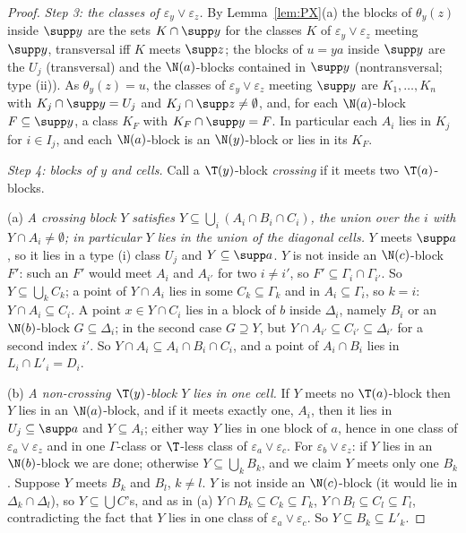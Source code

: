 \begin{proof}
\smallskip\emph{Step 3: the classes of $\varepsilon_y\vee\varepsilon_z$.} By Lemma~\ref{lem:PX}(a) the blocks of $\theta_y(z)$ inside $\supp y$ are the sets $K\cap\supp y$ for the classes $K$ of $\varepsilon_y\vee\varepsilon_z$ meeting $\supp y$, transversal iff $K$ meets $\supp z$; the blocks of $u=ya$ inside $\supp y$ are the $U_j$ (transversal) and the $\N(a)$-blocks contained in $\supp y$ (nontransversal; type (ii)). As $\theta_y(z)=u$, the classes of $\varepsilon_y\vee\varepsilon_z$ meeting $\supp y$ are $K_1,\dots,K_n$ with $K_j\cap\supp y=U_j$ and $K_j\cap\supp z\ne\emptyset$, and, for each $\N(a)$-block $F\subseteq\supp y$, a class $K_F$ with $K_F\cap\supp y=F$. In particular each $A_i$ lies in $K_j$ for $i\in I_j$, and each $\N(a)$-block is an $\N(y)$-block or lies in its $K_F$.

\smallskip\emph{Step 4: blocks of $y$ and cells.} Call a $\T(y)$-block \emph{crossing} if it meets two $\T(a)$-blocks.

(a) \emph{A crossing block $Y$ satisfies $Y\subseteq\bigcup_i(A_i\cap B_i\cap C_i)$, the union over the $i$ with $Y\cap A_i\ne\emptyset$; in particular $Y$ lies in the union of the diagonal cells.} $Y$ meets $\supp a$, so it lies in a type (i) class $U_j$ and $Y\subseteq\supp a$. $Y$ is not inside an $\N(c)$-block $F'$: such an $F'$ would meet $A_i$ and $A_{i'}$ for two $i\ne i'$, so $F'\subseteq\Gamma_i\cap\Gamma_{i'}$. So $Y\subseteq\bigcup_kC_k$; a point of $Y\cap A_i$ lies in some $C_k\subseteq\Gamma_k$ and in $A_i\subseteq\Gamma_i$, so $k=i$: $Y\cap A_i\subseteq C_i$. A point $x\in Y\cap C_i$ lies in a block of $b$ inside $\Delta_i$, namely $B_i$ or an $\N(b)$-block $G\subseteq\Delta_i$; in the second case $G\supseteq Y$, but $Y\cap A_{i'}\subseteq C_{i'}\subseteq\Delta_{i'}$ for a second index $i'$. So $Y\cap A_i\subseteq A_i\cap B_i\cap C_i$, and a point of $A_i\cap B_i$ lies in $L_i\cap L'_i=D_i$.

(b) \emph{A non-crossing $\T(y)$-block $Y$ lies in one cell.} If $Y$ meets no $\T(a)$-block then $Y$ lies in an $\N(a)$-block, and if it meets exactly one, $A_i$, then it lies in $U_j\subseteq\supp a$ and $Y\subseteq A_i$; either way $Y$ lies in one block of $a$, hence in one class of $\varepsilon_a\vee\varepsilon_z$ and in one $\Gamma$-class or $\T$-less class of $\varepsilon_a\vee\varepsilon_c$. For $\varepsilon_b\vee\varepsilon_z$: if $Y$ lies in an $\N(b)$-block we are done; otherwise $Y\subseteq\bigcup_kB_k$, and we claim $Y$ meets only one $B_k$. Suppose $Y$ meets $B_k$ and $B_l$, $k\ne l$. $Y$ is not inside an $\N(c)$-block (it would lie in $\Delta_k\cap\Delta_l$), so $Y\subseteq\bigcup C$'s, and as in (a) $Y\cap B_k\subseteq C_k\subseteq\Gamma_k$, $Y\cap B_l\subseteq C_l\subseteq\Gamma_l$, contradicting the fact that $Y$ lies in one class of $\varepsilon_a\vee\varepsilon_c$. So $Y\subseteq B_k\subseteq L'_k$.


\end{proof}
